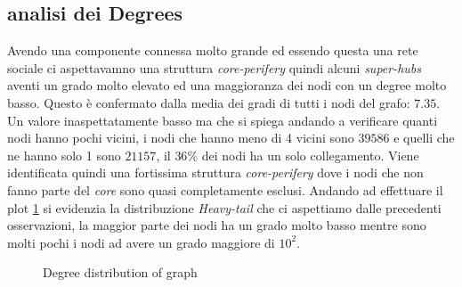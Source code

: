 \documentclass[a4paper]{article}
\begin{document}
\subsection{analisi dei Degrees}
\label{SEC:Degree}
Avendo una componente connessa molto grande ed essendo questa una rete sociale ci aspettavamno una struttura \textit{core-perifery} quindi alcuni \textit{super-hubs} aventi un grado molto elevato ed una maggioranza dei nodi con un degree molto basso.
Questo è confermato dalla media dei gradi di tutti i nodi del grafo: $7.35$.
Un valore inaspettatamente basso ma che si spiega andando a verificare quanti nodi hanno pochi vicini, i nodi che hanno meno di 4 vicini sono $39586$ e quelli che ne hanno solo 1 sono $21157$, il $36\%$ dei nodi ha un solo collegamento.
Viene identificata quindi una fortissima struttura \textit{core-perifery} dove i nodi che non fanno parte del \textit{core} sono quasi completamente esclusi.
Andando ad effettuare il plot \ref{FIG:degree_dist_G} si evidenzia la distribuzione \textit{Heavy-tail} che ci aspettiamo dalle precedenti osservazioni, la maggior parte dei nodi ha un grado molto basso mentre sono molti pochi i nodi ad avere un grado maggiore di $10^2$.
\begin{figure}[!ht]
\centering
{}
\caption{Degree distribution of graph} \label{FIG:degree_dist_G}
\end{figure}
\end{document}

